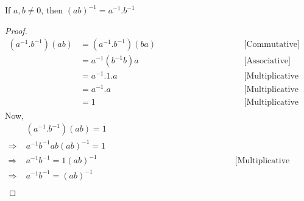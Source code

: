 \documentclass{article}
\newcommand{\Rw}{\Rightarrow}
\newcommand{\hs}{\hspace}
\begin{document}
\begin{theorem}{}{}
    If $a,b \neq 0$, then $(ab)^{-1} = a^{-1}.b^{-1}$
\begin{proof}
    \begin{align*}
        (a^{-1}.b^{-1})(ab)
         & = (a^{-1}.b^{-1})(ba) \hs{4cm} & \text{[Commutative]}             \\
         & = a^{-1}(b^{-1}b)a             & \text{[Associative]}             \\
         & =a^{-1}.1.a                    & \text{[Multiplicative Inverse]}  \\
         & =a^{-1}.a                      & \text{[Multiplicative Identity]} \\
         & =1                             & \text{[Multiplicative Inverse]}
    \end{align*}
    Now,
    \begin{align*}
              & (a^{-1}.b^{-1})(ab)=1  \hs{6cm}                                   \\
        \Rw\; & a^{-1}b^{-1}ab(ab)^{-1}=1                                         \\
        \Rw\; & a^{-1}b^{-1}=1(ab)^{-1}         & \text{[Multiplicative Inverse]} \\
        \Rw\; & a^{-1}b^{-1}=(ab)^{-1}                                            \\
    \end{align*}
\end{proof}
\end{theorem}
\end{document}
